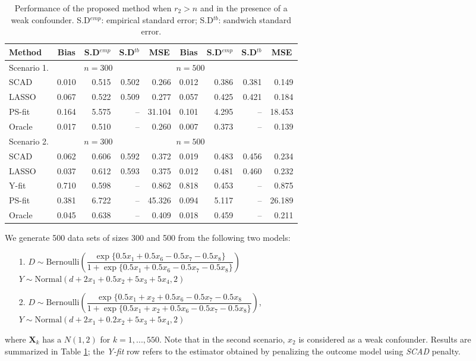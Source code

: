 \documentclass[11pt]{statsoc}
\begin{document}
\begin{table}
\caption{\label{tab:largep} Performance of the proposed method when $r_2>n$ and in the presence of a weak confounder. S.D$^{emp}$: empirical standard error; S.D$^{tb}$: sandwich standard error.}\centering
\begin{tabular}{lrrrr|rrrr|} \hline

Method   &\multicolumn{1}{c}{Bias} & \multicolumn{1}{c}{S.D$^{emp}$} & \multicolumn{1}{c}{S.D$^{tb}$} & \multicolumn{1}{c|}{MSE} &
\multicolumn{1}{c}{Bias} & \multicolumn{1}{c}{S.D$^{emp}$} & \multicolumn{1}{c}{S.D$^{tb}$}& \multicolumn{1}{c}{MSE}  \\ \hline
Scenario 1.               & \multicolumn{3}{c}{$n=300$} & \multicolumn{3}{c}{$n=500$} \\
SCAD  & 0.010 &0.515 &0.502&0.266&0.012 &0.386 &0.381&0.149  \\
LASSO    &    0.067 &0.522&0.509&  0.277&0.057 &0.425&0.421 & 0.184          \\
PS-fit   &          0.164 &5.575& --&31.104&0.101&4.295 &--&18.453  \\
Oracle   &          0.017 &0.510& --& 0.260&0.007& 0.373 &--& 0.139 \\ \hline
Scenario 2.               & \multicolumn{3}{c}{$n=300$} & \multicolumn{3}{c}{$n=500$} \\
SCAD   &0.062 &0.606 &0.592& 0.372&0.019 &0.483  &0.456&0.234  \\
LASSO    &    0.037 &0.612& 0.593 &0.375&0.012 &0.481 & 0.460&0.232         \\
Y-fit   &         0.710 &0.598  &--&0.862&0.818&0.453 &-- &0.875 \\
PS-fit   &          0.381 &6.722 &--&45.326&0.094&5.117 & --&26.189  \\
Oracle   &         0.045 &0.638 &--& 0.409&0.018& 0.459  &--&0.211 \\ \hline
\end{tabular}
\end{table}

We generate 500 data sets of sizes 300 and 500 from the following two models:
\begin{enumerate}
\item[1.] $D \sim \text{Bernoulli}\left(\dfrac{\exp\{0.5x_1+0.5x_6-0.5x_7-0.5x_8
\}}{1+\exp\{0.5x_1+0.5x_6-0.5x_7-0.5x_8\}}\right)$ \\
$Y \sim \text{Normal}(d+2x_1+0.5x_2+5x_3+5x_4, 2)$
\item[2.] $D \sim \text{Bernoulli}\left(\dfrac{\exp\{0.5x_1+x_2+0.5x_6-0.5x_7-0.5x_8}
    {1+\exp\{0.5x_1+x_2+0.5x_6-0.5x_7-0.5x_8\}}\right)$, \\
$Y \sim \text{Normal}(d+2x_1+0.2x_2+5x_3+5x_4, 2)$
\end{enumerate}
where ${\bm{X}}_k$ has a $N(1,2)$ for $k=1,...,550$. Note that in the second scenario, $x_2$ is considered as a weak confounder.  Results are summarized in Table \ref{tab:largep}; the {\it {Y-fit}} row refers to the estimator obtained by penalizing the outcome model using {\it SCAD} penalty.
\end{document}
